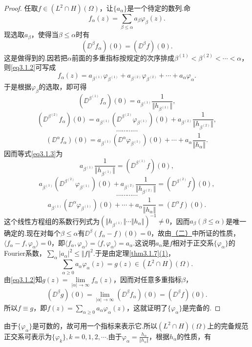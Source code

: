 \begin{proof}
	任取$f\in(L^2\cap H)(\Omega)$，让$\{a_\alpha\}$是一个待定的数列.命
	\begin{equation}\label{eq3.1.2}
		f_\alpha(z)=\sum_{\beta\le\alpha}a_\beta \varphi_\beta(z).
	\end{equation}
现选取$a_\beta$，使得当$\beta\le\alpha$时有
\begin{equation}\label{eq3.1.3}
	(\DD^\beta f_\alpha)(0)=(\DD^\beta f)(0).
\end{equation}
这是做得到的.因若把$\alpha$前面的多重指标按规定的次序排成$\beta^{(1)}<\beta^{(2)}<\cdots<\alpha$，则\eqref{eq3.1.2}可写成
\[f_\alpha(z)=a_{\beta^{(1)}}\varphi_{\beta^{(1)}}+a_{\beta^{(2)}}\varphi_{\beta^{(2)}}+\cdots+a_\alpha\varphi_\alpha.\]
于是根据$\varphi_\beta$的选取，即可得
\[(\DD^{\beta^{(1)}} f_\alpha)(0)=a_{\beta^{(1)}}\frac1{\Vert h_{\beta^{(1)}}\Vert},\]
\[(\DD^{\beta^{(2)}}f_\alpha)(0)=a_{\beta^{(1)}}(\DD^{\beta^{(2)}}\varphi_{\beta^{(1)}})(0)+a_{\beta^{(2)}}\frac1{\Vert h_{\beta^{(2)}}\Vert},\]
\[\cdots\cdots\cdots\cdots\]
\[(\DD^\alpha f_\alpha)(0)=a_{\beta^{(1)}}(\DD^{\alpha}\varphi_{\beta^{(1)}})(0)+\cdots+a_{\alpha}\frac1{\Vert h_{\alpha}\Vert}.\]
因而等式\eqref{eq3.1.3}为
\[a_{\beta^{(1)}}\frac1{\Vert h_{\beta^{(1)}}\Vert}=(\DD^{\beta^{(1)}}f)(0),\]
\[a_{\beta^{(1)}}(\DD^{\beta^{(2)}}\varphi_{\beta^{(1)}})(0)+a_{\beta^{(2)}}\frac1{\Vert h_{\beta^{(2)}}\Vert}=(\DD^{\beta^{(2)}}f)(0),\]
\[\cdots\cdots\cdots\cdots\]
\[a_{\beta^{(1)}}(\DD^{\alpha}\varphi_{\beta^{(1)}})(0)+\cdots+a_{\alpha}\frac1{\Vert h_{\alpha}\Vert}=(\DD^{\alpha}f)(0).\]
这个线性方程组的系数行列式为$(\Vert h_{\beta^{(1)}}\Vert\cdots\Vert h_\alpha\Vert)^{-1}\neq0$，因而$a_\beta(\beta\le\alpha)$是唯一确定的.现在对每个$\beta\le\alpha$有$\DD^\beta(f_\alpha-f)(0)=0$，故由\hyperlink{3.1.11}{（二）}中所证的性质，$\langle f_\alpha-f,\varphi_\alpha\rangle=0$，即$\langle f_\alpha,\varphi_\alpha\rangle=\langle f,\varphi_\alpha\rangle=a_\alpha$.这说明$a_\alpha$是$f$相对于正交系$\{\varphi_\alpha\}$的Fourier系数，$\sum\limits_\alpha|a_\alpha|^2\le\Vert f\Vert^2$.于是由定理\ref{thm3.1.7}\hyperlink{3.1.7}{(1)}，
\[\sum_{\alpha\ge0}a_\alpha\varphi_\alpha(z)=g(z)\in(L^2\cap H)(\Omega).\]
由\eqref{eq3.1.2}知$g(z)=\lim\limits_{|\alpha|\to\infty}f_\alpha(z)$，因而对任意多重指标$\beta$，
\[(\DD^\beta g)(0)=\lim_{|\alpha|\to\infty} (\DD^\beta f_\alpha)(0)=(\DD^\beta f)(0).\]
所以$f\equiv g$，即$f(z)=\sum\limits_{\alpha\ge0}a_\alpha\varphi_\alpha(z)$，这就证明了$\{\varphi_\alpha\}$是完备的.
\end{proof}
由于$\{\varphi_\alpha\}$是可数的，故可用一个指标来表示它.所以$(L^2\cap H)(\Omega)$上的完备规范正交系可表示为$\{\varphi_k\},k=0,1,2,\cdots$.由于$\varphi_\alpha=\frac{h_\alpha}{\Vert h_\alpha\Vert}$，根据$h_\alpha$的性质，有
